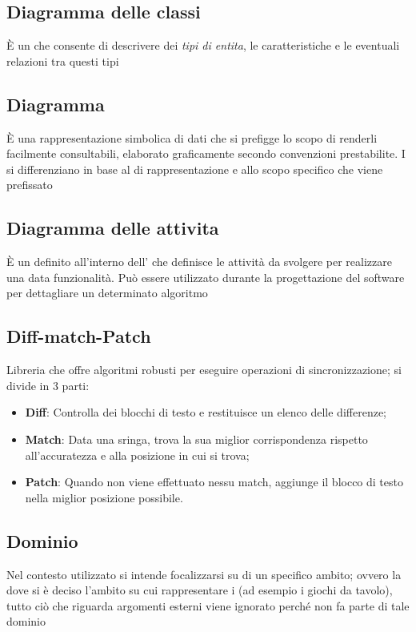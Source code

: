 {{		\subsection{Diagramma delle classi}
		È un  che consente di descrivere dei \emph{tipi di entita}, le caratteristiche e le eventuali relazioni tra questi tipi



		\subsection{Diagramma}
		È una rappresentazione simbolica di dati che si prefigge lo scopo di renderli facilmente consultabili, elaborato graficamente secondo convenzioni prestabilite. I  si differenziano in base al  di rappresentazione e allo scopo specifico che viene prefissato


		\subsection{Diagramma delle attivita}
		È un  definito all'interno dell’ che definisce le attività da svolgere per realizzare una data funzionalità. Può essere utilizzato durante la progettazione del software per dettagliare un determinato algoritmo

		\subsection{Diff-match-Patch}
		Libreria che offre algoritmi robusti per eseguire operazioni di sincronizzazione; si divide in 3 parti:
		\begin{itemize}
		\item \textbf{Diff}: Controlla dei blocchi di testo e restituisce un elenco delle differenze;
		\item \textbf{Match}: Data una sringa, trova la sua miglior corrispondenza rispetto all'accuratezza e alla posizione in cui si trova;
		\item \textbf{Patch}: Quando non viene effettuato nessu match, aggiunge il blocco di testo nella miglior posizione possibile.
\end{itemize} 

		\subsection{Dominio}
		Nel contesto utilizzato si intende focalizzarsi su di un specifico ambito; ovvero la dove si è deciso l’ambito su cui rappresentare i  (ad esempio i giochi da tavolo), tutto ciò che riguarda argomenti esterni viene ignorato perché non fa parte di tale dominio



}}
